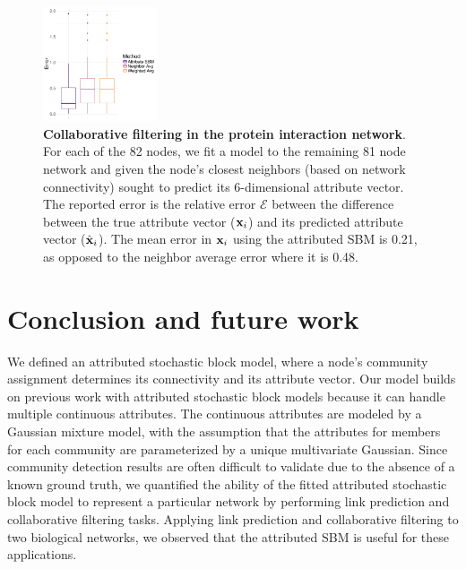 \documentclass[10pt,journal,compsoc]{IEEEtran}
\begin{document}
\begin{figure}[h!]
\begin{center}
\includegraphics[width=0.3\textwidth]{CollabProtein.pdf}
\caption{{\bf Collaborative filtering in the protein interaction network}. For each of the 82 nodes, we fit a model to the remaining 81 node network and given the node's closest  neighbors (based on network connectivity) sought to predict its 6-dimensional attribute vector. The reported error is the relative error $\mathcal{E}$ between the difference between the true attribute vector (${\bf x}_{i}$) and its predicted attribute vector (${\hat{\bf x}}_{i}$). The mean error in ${\bf x}_{i}$ using the attributed SBM is 0.21, as opposed to the neighbor average error where it is 0.48. }
\label{collabprotein}
\end{center}
\end{figure}

\section{Conclusion and future work}
We defined an attributed stochastic block model, where a node's community assignment determines its connectivity and its attribute vector. Our model builds on previous work with attributed stochastic block models because it can handle multiple continuous attributes. The continuous attributes are modeled by a Gaussian mixture model, with the assumption that the attributes for members for each community are parameterized by a unique multivariate Gaussian. Since community detection results are often difficult to validate due to the absence of a known ground truth, we quantified the ability of the fitted attributed stochastic block model to represent a particular network by performing link prediction and collaborative filtering tasks. Applying link prediction and collaborative filtering to two biological networks, we observed that the attributed SBM is useful for these applications.
\end{document}

